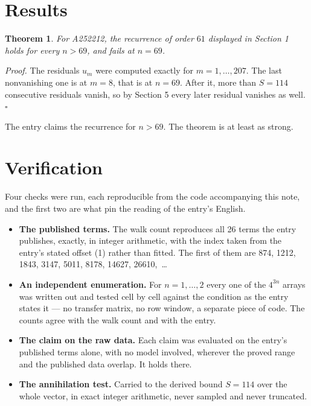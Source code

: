 \documentclass[11pt]{article}
\newtheorem{theorem}{Theorem}
\theoremstyle{definition}
\begin{document}
\section{Results}

\begin{theorem} For A252212, the recurrence of order $61$ displayed in Section 1 holds for every $n > 69$, and fails at $n = 69$.\end{theorem}

{\itshape Proof.} The residuals $u_m$ were computed exactly for $m = 1,\dots,207$. The last nonvanishing one is at $m = 8$, that is at $n = 69$. After it, more than $S = 114$ consecutive residuals vanish, so by Section 5 every later residual vanishes as well. $\square$

The entry claims the recurrence for $n > 69$. The theorem is at least as strong.

\section{Verification}

Four checks were run, each reproducible from the code accompanying this note, and the first two are what pin the reading of the entry's English.

\begin{itemize}

\item {\bfseries The published terms.} The walk count reproduces all 26 terms the entry publishes, exactly, in integer arithmetic, with the index taken from the entry's stated offset (1) rather than fitted. The first of them are 874, 1212, 1843, 3147, 5011, 8178, 14627, 26610,~\dots

\item {\bfseries An independent enumeration.} For $n = 1,\dots,2$ every one of the $4^{3n}$ arrays was written out and tested cell by cell against the condition as the entry states it --- no transfer matrix, no row window, a separate piece of code. The counts agree with the walk count and with the entry.

\item {\bfseries The claim on the raw data.} Each claim was evaluated on the entry's published terms alone, with no model involved, wherever the proved range and the published data overlap. It holds there.

\item {\bfseries The annihilation test.} Carried to the derived bound $S = 114$ over the whole vector, in exact integer arithmetic, never sampled and never truncated.

\end{itemize}
\end{document}
